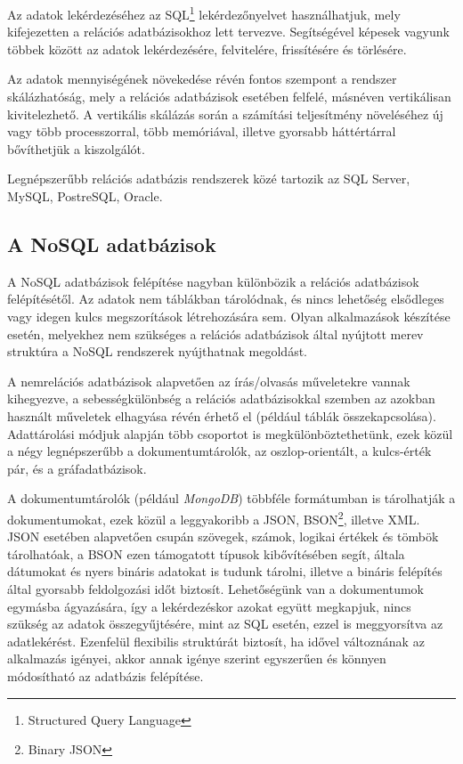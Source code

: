 \documentclass[
]{thesis-ekf}
\theoremstyle{definition}
\theoremstyle{remark}
\begin{document}
	Az adatok lekérdezéséhez az SQL\footnote{Structured Query Language} lekérdezőnyelvet használhatjuk, mely kifejezetten a relációs adatbázisokhoz lett tervezve. Segítségével képesek vagyunk többek között az adatok lekérdezésére, felvitelére, frissítésére és törlésére.
	
	Az adatok mennyiségének növekedése révén fontos szempont a rendszer skálázhatóság, mely a relációs adatbázisok esetében felfelé, másnéven vertikálisan kivitelezhető. A vertikális skálázás során a számítási teljesítmény növeléséhez új vagy több processzorral, több memóriával, illetve gyorsabb háttértárral bővíthetjük a kiszolgálót.
	
	Legnépszerűbb relációs adatbázis rendszerek közé tartozik az SQL Server, MySQL, PostreSQL, Oracle.
	
	\subsection[A NoSQL adatbázisok]{A NoSQL adatbázisok\cite{mongo_typeofnosqldbs}\cite{aws_graphdb}}
	A NoSQL adatbázisok felépítése nagyban különbözik a relációs adatbázisok felépítésétől. Az adatok nem táblákban tárolódnak, és nincs lehetőség elsődleges vagy idegen kulcs megszorítások létrehozására sem. Olyan alkalmazások készítése esetén, melyekhez nem szükséges a relációs adatbázisok által nyújtott merev struktúra a NoSQL rendszerek nyújthatnak megoldást.
	
	A nemrelációs adatbázisok alapvetően az írás/olvasás műveletekre vannak kihegyezve, a sebességkülönbség a relációs adatbázisokkal szemben az azokban használt műveletek elhagyása révén érhető el (például táblák összekapcsolása). Adattárolási módjuk alapján több csoportot is megkülönböztethetünk, ezek közül a négy legnépszerűbb a dokumentumtárolók, az oszlop-orientált, a kulcs-érték pár, és a gráfadatbázisok.
	
	A dokumentumtárolók (például \emph{MongoDB}) többféle formátumban is tárolhatják a dokumentumokat, ezek közül a leggyakoribb a JSON, BSON\footnote{Binary JSON}, illetve XML\cite{mongodb_json_bson}. JSON esetében alapvetően csupán szövegek, számok, logikai értékek és tömbök tárolhatóak, a BSON ezen támogatott típusok kibővítésében segít, általa dátumokat és nyers bináris adatokat is tudunk tárolni, illetve a bináris felépítés által gyorsabb feldolgozási időt biztosít. Lehetőségünk van a dokumentumok egymásba ágyazására, így a lekérdezéskor azokat együtt megkapjuk, nincs szükség az adatok összegyűjtésére, mint az SQL esetén, ezzel is meggyorsítva az adatlekérést. Ezenfelül flexibilis struktúrát biztosít, ha idővel változnának az alkalmazás igényei, akkor annak igénye szerint egyszerűen és könnyen módosítható az adatbázis felépítése.
	
\end{document}
